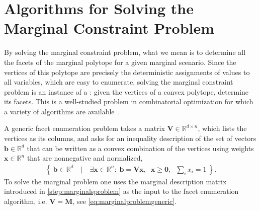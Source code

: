 \documentclass[aps,english,10pt,superscriptaddress,onecolumn,twoside,longbibliography,pra,floatfix,fleqn,nofootinbib]{revtex4-1}
\newcommand*{\tblue}[1]{{\color{MidnightBlue}{\textbf{#1}}}}
\theoremstyle{definition}
\begin{document}
\appendix
{}
\let\stdsection\section
\renewcommand{\section}{\clearpage\stdsection} 

\section{Algorithms for Solving the Marginal Constraint Problem}\label{sec:projalgorithms}

By solving the marginal constraint problem, what we mean is to determine all the facets of the marginal polytope for a given marginal scenario. Since the vertices of this polytope are precisely the deterministic assignments of values to all variables, which are easy to enumerate, solving the marginal constraint problem is an instance of a \tblue{facet enumeration problem}: given the vertices of a convex polytope, determine its facets. This is a well-studied problem in combinatorial optimization for which a variety of algorithms are available~\cite{avis_convexhull_2015}. 

A generic facet enumeration problem takes a matrix $\bm{V}\in\mathbb{R}^{d\times n}$, which lists the vertices as its columns, and asks for an inequality description of the set of vectors $\bm{b}\in\mathbb{R}^d$ that can be written as a convex combination of the vertices using weights $\bm{x}\in\mathbb{R}^n$ that are nonnegative and normalized,
\begin{align}
	\label{projsimplex}
	\left\{\: \bm{b}\in\mathbb{R}^d \quad\bigg|\quad \exists \bm{x}\in\mathbb{R}^n:\; \bm{b} = \bm{V}\bm{x} ,\;\; \bm{x}\geq \bm{0},\;\; {{\sum_i}{x_i}}=1 \:\right\}.
\end{align}
To solve the marginal problem one uses the marginal description matrix introduced in \cref{step:marginalsproblem} as the input to the facet enumeration algorithm, i.e. $\bm{V}=\bm{M}$, see \cref{eq:marginalproblemgeneric}.
\end{document}

